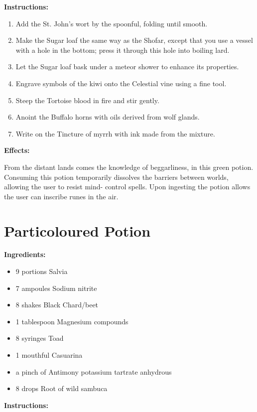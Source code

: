 \documentclass{article}
\begin{document}
\textbf{Instructions:}

\begin{enumerate}
  \item Add the St. John's wort by the spoonful, folding until smooth.
  \item Make the Sugar loaf the same way as the Shofar, except that you use a vessel with a hole in the bottom; press it through this hole into boiling lard.
  \item Let the Sugar loaf bask under a meteor shower to enhance its properties.
  \item Engrave symbols of the kiwi onto the Celestial vine using a fine tool.
  \item Steep the Tortoise blood in fire and stir gently.
  \item Anoint the Buffalo horns with oils derived from wolf glands.
  \item Write on the Tincture of myrrh with ink made from the mixture.
\end{enumerate}

\textbf{Effects:}

From the distant lands comes the knowledge of beggarliness, in this green potion. Consuming this potion temporarily dissolves the barriers between worlds, allowing the user to resist mind- control spells. Upon ingesting the potion allows the user can inscribe runes in the air.

\newpage
\section*{Particoloured Potion}

\textbf{Ingredients:}

\begin{itemize}
  \item 9 portions Salvia
  \item 7 ampoules Sodium nitrite
  \item 8 shakes Black Chard/beet
  \item 1 tablespoon Magnesium compounds
  \item 8 syringes Toad
  \item 1 mouthful Casuarina
  \item a pinch of Antimony potassium tartrate anhydrous
  \item 8 drops Root of wild sambuca
\end{itemize}

\textbf{Instructions:}
\end{document}
